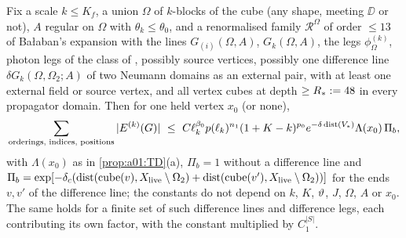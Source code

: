 \begin{theorem}\label{thm:a01:B2}
Fix a scale $k\le K_f$, a union $\Omega$ of $k$-blocks of the cube (any shape, meeting $\DD$ or not), $A$ regular on $\Omega$ with $\theta_k\le\theta_0$, and a renormalised family $\mathcal R^\Omega$ of order $\le13$ of Ba{\l}aban's expansion with the lines $G_{(i)}(\Omega,A)$, $G_k(\Omega,A)$, the legs $\phi^{(k)}_\Omega$, photon legs of the class of \cite[p.~412]{Ba3}, possibly source vertices, possibly one difference line $\delta G_k(\Omega,\Omega_2;A)$ of two Neumann domains as an external pair, with at least one external field or source vertex, and all vertex cubes at depth $\ge R_*:=48$ in every propagator domain. Then for one held vertex $x_0$ (or none),
\[
\sum_{\text{orderings, indices, positions}}|E^{(k)}(G)|\ \le\ C\ell_k^{\beta_0}p(\ell_k)^{n_1}(1+K-k)^{p_0}e^{-\delta\dist(V_*)}\Lambda(x_0)\,\Pi_b,
\]
with $\Lambda(x_0)$ as in \cref{prop:a01:TD}(a), $\Pi_b=1$ without a difference line and $\Pi_b=\exp[-\delta_c(\operatorname{dist}(\mathrm{cube}(v),X_{\mathrm{live}}\setminus\Omega_2)+\operatorname{dist}(\mathrm{cube}(v'),X_{\mathrm{live}}\setminus\Omega_2))]$ for the ends $v,v'$ of the difference line; the constants do not depend on $k$, $K$, $\vartheta$, $J$, $\Omega$, $A$ or $x_0$. The same holds for a finite set of such difference lines and difference legs, each contributing its own factor, with the constant multiplied by $C_1^{|S|}$.
\end{theorem}
